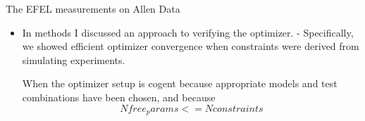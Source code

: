 The EFEL measurements on Allen Data








\begin{itemize}

\item  In methods I discussed an approach to verifying the optimizer.
- Specifically, we showed efficient optimizer convergence when constraints were derived from simulating experiments.

When the optimizer setup is cogent because appropriate models and test combinations have been chosen, and because 
\begin{equation}

N free_params <= N constraints
\end{equation}


\end{itemize}


